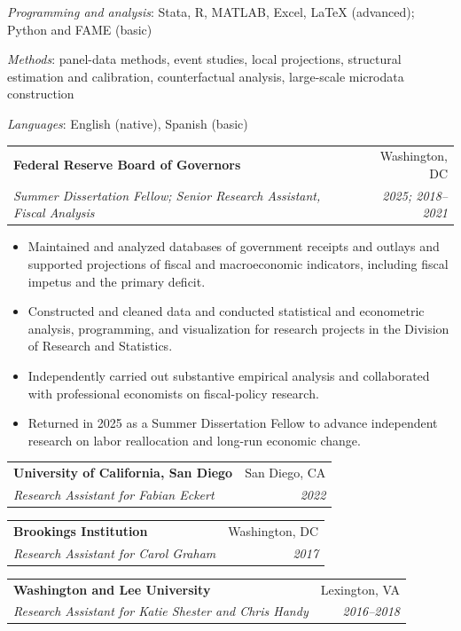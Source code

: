 \documentclass[a4paper,11pt]{article}
\makeatletter
\renewcommand{\sectionBlock}[2]{%
  \noindent
  \begin{minipage}[t]{2.45cm}
    \raggedright #1
  \end{minipage}%
  \hspace{0.5cm}%
  \begin{minipage}[t]{\dimexpr\linewidth-3.05cm\relax}
    \raggedright #2
  \end{minipage}
  \vspace{18pt}
}
\newcommand{\consultListStart}{%
  \begin{itemize}[leftmargin=1.15em,label=\textbullet,itemsep=1.5pt,
                  topsep=3pt,parsep=0pt,partopsep=0pt]
}
\newcommand{\consultListEnd}{\end{itemize}}
\newcommand{\experienceHeading}[4]{%
  \begin{tabularx}{\linewidth}[t]{@{}Xr@{}}
    \textbf{#1} & #2 \\
    \textit{#3} & \textit{#4}
  \end{tabularx}\vspace{1pt}
}
\makeatother
\begin{document}
\sectionBlock{
}{
\skillListStart
  \item \emph{Programming and analysis}: Stata, R, MATLAB, Excel, \LaTeX{} (advanced); Python and FAME (basic)
  \item \emph{Methods}: panel-data methods, event studies, local projections, structural estimation and calibration, counterfactual analysis, large-scale microdata construction
  \item \emph{Languages}: English (native), Spanish (basic)
\skillListEnd
}

\newpage
\vspace*{0.22in}

\sectionBlock{
}{
\experienceHeading
  {Federal Reserve Board of Governors}{Washington, DC}
  {Summer Dissertation Fellow; Senior Research Assistant, Fiscal Analysis}{2025; 2018--2021}
\consultListStart
  \item Maintained and analyzed databases of government receipts and outlays and supported projections of fiscal and macroeconomic indicators, including fiscal impetus and the primary deficit.
  \item Constructed and cleaned data and conducted statistical and econometric analysis, programming, and visualization for research projects in the Division of Research and Statistics.
  \item Independently carried out substantive empirical analysis and collaborated with professional economists on fiscal-policy research.
  \item Returned in 2025 as a Summer Dissertation Fellow to advance independent research on labor reallocation and long-run economic change.
\consultListEnd

\vspace{7pt}
\experienceHeading
  {University of California, San Diego}{San Diego, CA}
  {Research Assistant for Fabian Eckert}{2022}

\vspace{7pt}
\experienceHeading
  {Brookings Institution}{Washington, DC}
  {Research Assistant for Carol Graham}{2017}

\vspace{7pt}
\experienceHeading
  {Washington and Lee University}{Lexington, VA}
  {Research Assistant for Katie Shester and Chris Handy}{2016--2018}
}
\end{document}
